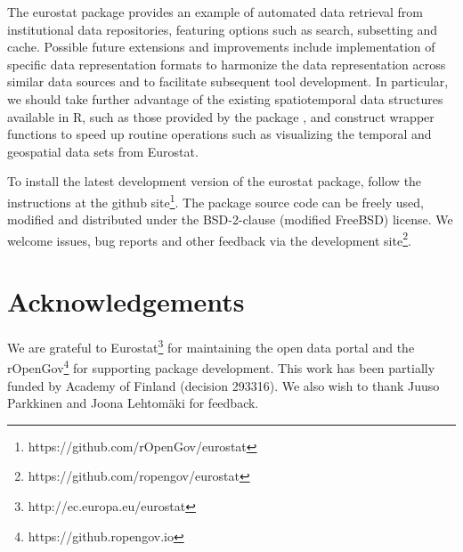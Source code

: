 The eurostat package provides an example of automated data retrieval
from institutional data repositories, featuring options such as
search, subsetting and cache. Possible future extensions and
improvements include implementation of specific data representation
formats to harmonize the data representation across similar data
sources and to facilitate subsequent tool development. In particular,
we should take further advantage of the existing spatiotemporal data
structures available in R, such as those provided by
the  package \cite{xxx}, and construct wrapper
functions to speed up routine operations such as visualizing the
temporal and geospatial data sets from Eurostat.

To install the latest development version of the eurostat package,
follow the instructions at the github
site\footnote{https://github.com/rOpenGov/eurostat}. The package
source code can be freely used, modified and distributed under the
BSD-2-clause (modified FreeBSD) license. We welcome issues, bug
reports and other feedback via the development
site\footnote{https://github.com/ropengov/eurostat}.


\section*{Acknowledgements}

We are grateful to Eurostat\footnote{http://ec.europa.eu/eurostat} for
maintaining the open data portal and the
rOpenGov\footnote{https://github.ropengov.io} for supporting package
development. This work has been partially funded by Academy of Finland
(decision 293316). We also wish to thank Juuso Parkkinen and Joona
Lehtom{\"a}ki for feedback.




\address{Leo Lahti\\
  Department of Mathematics and Statistics\\
  PO Box 20014 University of Turku\\
  Finland\\}

\address{Janne Huovari\\
  Affiliation\\
  Address\\
  Country\\}

\address{Markus Kainu\\
  Affiliation\\
  Address\\
  Country\\}

\address{Przemyslaw Biecek\\
  Faculty of Mathematics, Informatics, and Mechanics\\
  University of Warsaw\\
  Banacha 2, 02-097 Warsaw\\
  Poland\\}

